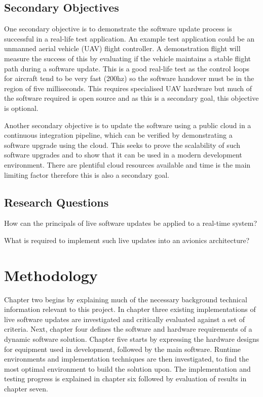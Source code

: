 \subsection{Secondary Objectives}
One secondary objective is to demonstrate the software update process is successful in a real-life test application. An example test application could be an unmanned aerial vehicle (UAV) flight controller. A demonstration flight will measure the success of this by evaluating if the vehicle maintains a stable flight path during a software update. This is a good real-life test as the control loops for aircraft tend to be very fast (200hz) so the software handover must be in the region of five milliseconds. This requires specialised UAV hardware but much of the software required is open source and as this is a secondary goal, this objective is optional.

Another secondary objective is to update the software using a public cloud in a continuous integration pipeline, which can be verified by demonstrating a software upgrade using the cloud. This seeks to prove the scalability of such software upgrades and to show that it can be used in a modern development environment. There are plentiful cloud resources available and time is the main limiting factor therefore this is also a secondary goal.

\newpage

\subsection{Research Questions}
How can the principals of live software updates be applied to a real-time system?

What is required to implement such live updates into an avionics architecture?

\section{Methodology}
Chapter two begins by explaining much of the necessary background technical information relevant to this project. In chapter three existing implementations of live software updates are investigated and critically evaluated against a set of criteria. Next, chapter four defines the software and hardware requirements of a dynamic software solution. Chapter five starts by expressing the hardware designs for equipment used in development, followed by the main software. Runtime environments and implementation techniques are then investigated, to find the most optimal environment to build the solution upon. The implementation and testing progress is explained in chapter six followed by evaluation of results in chapter seven.




